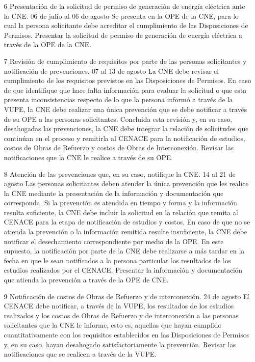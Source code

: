  6
 Presentación de la solicitud de permiso de generación de energía eléctrica ante la CNE.
 06 de julio al 06 de agosto
 Se presenta en la OPE de la CNE, para lo cual la persona solicitante debe acreditar el cumplimiento de las Disposiciones de Permisos.
 Presentar la solicitud de permiso de generación de energía eléctrica a través de la OPE de la CNE.
 
 7
 Revisión de cumplimiento de requisitos por parte de las personas solicitantes y notificación de prevenciones.
 07 al 13 de agosto
 La CNE debe revisar el cumplimiento de los requisitos previstos en las Disposiciones de Permisos. En caso de que identifique que hace falta información para evaluar la solicitud o que esta presenta inconsistencias respecto de lo que la persona informó a través de la VUPE, la CNE debe realizar una única prevención que se debe notificar a través de su OPE a las personas solicitantes. Concluida esta revisión y, en su caso, desahogadas las prevenciones, la CNE debe integrar la relación de solicitudes que continúan en el proceso y remitirla al CENACE para la notificación de estudios, costos de Obras de Refuerzo y costos de Obras de Interconexión.
 Revisar las notificaciones que la CNE le realice a través de su OPE.
 
 8
 Atención de las prevenciones que, en su caso, notifique la CNE.
 14 al 21 de agosto
 Las personas solicitantes deben atender la única prevención que les realice la CNE mediante la presentación de la información y documentación que corresponda. Si la prevención es atendida en tiempo y forma y la información resulta suficiente, la CNE debe incluir la solicitud en la relación que remita al CENACE para la etapa de notificación de estudios y costos. En caso de que no se atienda la prevención o la información remitida resulte insuficiente, la CNE debe notificar el desechamiento correspondiente por medio de la OPE. En este supuesto, la notificación por parte de la CNE debe realizarse a más tardar en la fecha en que le sean notificados a la persona particular los resultados de los estudios realizados por el CENACE.
 Presentar la información y documentación que atienda la prevención a través de la OPE de CNE.
 
 9
 Notificación de costos de Obras de Refuerzo y de interconexión.
 24 de agosto
 El CENACE debe notificar, a través de la VUPE, los resultados de los estudios realizados y los costos de Obras de Refuerzo y de interconexión a las personas solicitantes que la CNE le informe, esto es, aquellas que hayan cumplido cuantitativamente con los requisitos establecidos en las Disposiciones de Permisos y, en su caso, hayan desahogado satisfactoriamente la prevención.
 Revisar las notificaciones que se realicen a través de la VUPE.
 
